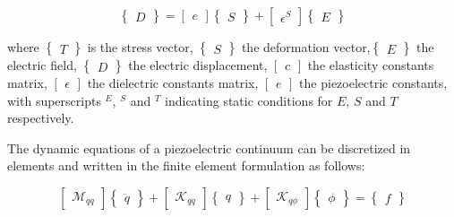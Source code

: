 \documentclass{ifacconf}
\begin{document}
\begin{equation}
\begin{Bmatrix} D \end{Bmatrix} = \begin{bmatrix} e
\end{bmatrix}\begin{Bmatrix} S \end{Bmatrix} + \begin{bmatrix} \epsilon^S \end{bmatrix}\begin{Bmatrix} E \end{Bmatrix}
\end{equation} 

where $\begin{Bmatrix}T\end{Bmatrix} $ is the stress vector, $\begin{Bmatrix} S \end{Bmatrix}$ the deformation vector,$ \begin{Bmatrix} E \end{Bmatrix}$ the electric field, $ \begin{Bmatrix} D \end{Bmatrix}$ the electric displacement, $ \begin{bmatrix} c \end{bmatrix}$ the elasticity constants matrix, $ \begin{bmatrix} \epsilon \end{bmatrix}$ the dielectric constants matrix, $ \begin{bmatrix} e \end{bmatrix}$ the piezoelectric constants, with superscripts $^E$, $^S$ and $^T$ indicating static conditions for $E$, $S$ and $T$ respectively.

The dynamic equations of a piezoelectric continuum can be discretized in elements and written in the finite element formulation as follows:

\begin{equation}
\begin{bmatrix} \mathcal{M}_{qq} \end{bmatrix} \begin{Bmatrix} \ddot{q} \end{Bmatrix} + \begin{bmatrix} \mathcal{K}_{qq} \end{bmatrix} \begin{Bmatrix} q \end{Bmatrix} + \begin{bmatrix} \mathcal{K}_{q\phi} \end{bmatrix} \begin{Bmatrix} \phi \end{Bmatrix} = \begin{Bmatrix} f \end{Bmatrix}
\end{equation}
\end{document}
